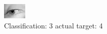 \begin{figure}[h!]
\begin{center}
\includegraphics[width=0.60\columnwidth]{figures/ID3030_class_3_target_4.png}
\end{center}
\caption{ Classification: 3 actual target: 4}
\label{fig:ID3030_class_3_target_4}
\end{figure}
